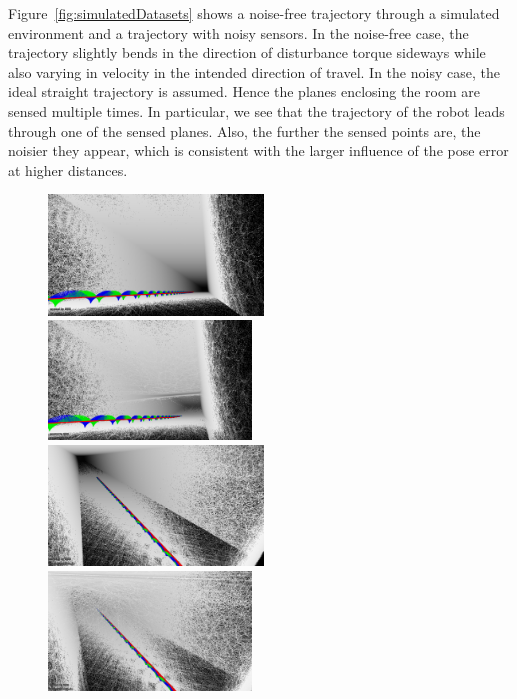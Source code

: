Figure~\ref{fig:simulatedDatasets} shows a noise-free trajectory through a simulated environment and a trajectory with noisy sensors.
In the noise-free case, the trajectory slightly bends in the direction of disturbance torque sideways while also varying in velocity in the intended direction of travel.
In the noisy case, the ideal straight trajectory is assumed.
Hence the planes enclosing the room are sensed multiple times. 
In particular, we see that the trajectory of the robot leads through one of the sensed planes. 
Also, the further the sensed points are, the noisier they appear, which is consistent with the larger influence of the pose error at higher distances.  

\begin{figure}
	\centering
	\includegraphics[width=0.51\textwidth]{images/perfect_bottom}\hfill
	\includegraphics[width=0.48\textwidth]{images/noisy_pose_and_range_bottom}\\
	\includegraphics[width=0.51\textwidth]{images/perfect_top}\hfill
	\includegraphics[width=0.48\textwidth]{images/noisy_pose_and_range_top}\\

\end{figure}
